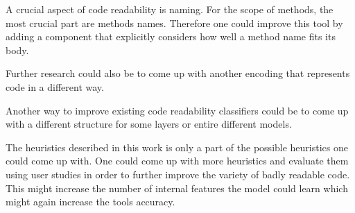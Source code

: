 \documentclass[%
class=scrreprt,
chapterprefix=false,%
open=right,%
twoside=false,%
paper=a4,%
logofile={Logo\_zentral\_farbig\_EN.png},%
thesistype=master,%
UKenglish,%
]{se2thesis}
\begin{document}
	A crucial aspect of code readability is naming. For the scope of methods, the most crucial part are methods names. Therefore one could improve this tool by adding a component that explicitly considers how well a method name fits its body.
	
	Further research could also be to come up with another encoding that represents code in a different way.
	
	Another way to improve existing code readability classifiers could be to come up with a different structure for some layers or entire different models.
	
	The heuristics described in this work is only a part of the possible heuristics one could come up with. One could come up with more heuristics and evaluate them using user studies in order to further improve the variety of badly readable code. This might increase the number of internal features the model could learn which might again increase the tools accuracy.

	
	\backmatter
	
	\printbibliography
	
\end{document}
